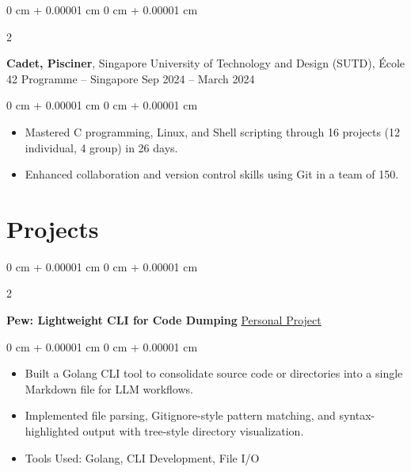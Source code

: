 \documentclass[10pt, letterpaper]{article}
\newenvironment{highlights}{
    \begin{itemize}[
        topsep=0.10 cm,
        parsep=0.10 cm,
        partopsep=0pt,
        itemsep=0pt,
        leftmargin=0 cm + 10pt
    ]
}{
    \end{itemize}
} %
\newenvironment{onecolentry}{
    \begin{adjustwidth}{
        0 cm + 0.00001 cm
    }{
        0 cm + 0.00001 cm
    }
}{
    \end{adjustwidth}
} %
\newenvironment{twocolentry}[2][]{
    \onecolentry
    \def\secondColumn{#2}
    \setcolumnwidth{\fill, 4.5 cm}
    \begin{paracol}{2}
}{
    \switchcolumn \raggedleft \secondColumn
    \end{paracol}
    \endonecolentry
} %
\begin{document}
                \vspace{0.2 cm}
                
                \vspace{0.2 cm}
                
                \begin{twocolentry}{
                    Sep 2024 – March 2024
                }
                    \textbf{Cadet, Pisciner}, Singapore University of Technology and Design (SUTD), École 42 Programme -- Singapore\end{twocolentry}
                \vspace{0.10 cm}
                \begin{onecolentry}
                    \begin{highlights}
                        \item Mastered C programming, Linux, and Shell scripting through 16 projects (12 individual, 4 group) in 26 days.
                        \item Enhanced collaboration and version control skills using Git in a team of 150.
                    \end{highlights}
                \end{onecolentry}
        
                \vspace{0.2 cm}
    
        \section{Projects}

\begin{twocolentry}{
            \href{https://github.com/yuann3/Pew/}{Personal Project}
        }
            \textbf{Pew: Lightweight CLI for Code Dumping}\end{twocolentry}

        \vspace{0.10 cm}
        \begin{onecolentry}
            \begin{highlights}
                \item Built a Golang CLI tool to consolidate source code or directories into a single Markdown file for LLM workflows.
                \item Implemented file parsing, Gitignore-style pattern matching, and syntax-highlighted output with tree-style directory visualization.
                \item Tools Used: Golang, CLI Development, File I/O
            \end{highlights}
        \end{onecolentry}
\end{document}
